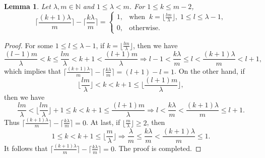 \documentclass[journal,12pt,onecolumn]{IEEEtran}
\newtheorem{lemma}[theorem]{Lemma}
\begin{document}
\begin{lemma}\label{ceil_prop}
    Let $\lambda,m\in\mathbb{N}$ and $1\le \lambda<m$. For $1\le k\le m-2$, 
    \[
        \bigg\lceil\frac{(k+1)\lambda}{m}\bigg\rceil-\bigg\lceil\frac{k\lambda}{m}\bigg\rceil=\begin{cases}
            1, &\text{when}\;\;k=\big\lfloor\frac{l m}{\lambda}\big\rfloor,\;1\le l\le\lambda-1,\\
            0, &\text{otherwise}.
        \end{cases}
    \]
\end{lemma}
\begin{proof}
    For some $1\le l\le\lambda-1$, if $k=\big\lfloor\frac{l m}{\lambda}\big\rfloor$, then we have
    \[
        \frac{(l-1)m}{\lambda}<k\le\frac{l m}{\lambda}<k+1<\frac{(l+1)m}{\lambda}\Longrightarrow l-1<\frac{k\lambda}{m}\le l<\frac{(k+1)\lambda}{m}<l+1,
    \]
    which implies that $\big\lceil\frac{(k+1)\lambda}{m}\big\rceil-\big\lceil\frac{k\lambda}{m}\big\rceil=(l+1)-l=1$. On the other hand, if 
    \[
        \bigg\lfloor\frac{l m}{\lambda}\bigg\rfloor<k<k+1\le\bigg\lfloor\frac{(l+1)m}{\lambda}\bigg\rfloor,
    \]
    then we have
    \[
        \frac{l m}{\lambda}<\bigg\lfloor\frac{l m}{\lambda}\bigg\rfloor+1\le k<k+1\le\frac{(l+1)m}{\lambda}\Longrightarrow l<\frac{k\lambda}{m}<\frac{(k+1)\lambda}{m}\le l+1.
    \]
    Thus $\big\lceil\frac{(k+1)\lambda}{m}\big\rceil-\big\lceil\frac{k\lambda}{m}\big\rceil=0$. At last, if $\big\lfloor\frac{m}{\lambda}\big\rfloor\ge2$, then 
    \[
        1\le k<k+1\le\bigg\lfloor\frac{m}{\lambda}\bigg\rfloor\Longrightarrow \frac{\lambda}{m}\le \frac{k\lambda}{m}<\frac{(k+1)\lambda}{m}\le 1. 
    \]
    It follows that $\big\lceil\frac{(k+1)\lambda}{m}\big\rceil-\big\lceil\frac{k\lambda}{m}\big\rceil=0$. The proof is completed. 
\end{proof}
\end{document}
